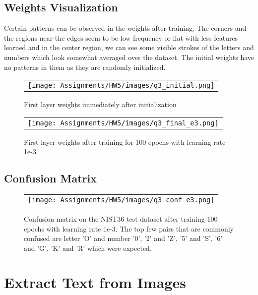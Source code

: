 \documentclass[a4paper]{article}
\begin{document}
\subsection{Weights Visualization}
Certain patterns can be observed in the weights after training. The corners and the regions near the edges seem to be low frequency or flat with less features learned and in the center region, we can see some visible strokes of the letters and numbers which look somewhat averaged over the dataset. The initial weights have no patterns in them as they are randomly initialized.\\
\begin{figure}[!ht]
\centering
\begin{tabular}{c}
{\texttt{[image: Assignments/HW5/images/q3\_initial.png]}}
\end{tabular}
\caption{First layer weights immediately after initialization}
\end{figure}

\begin{figure}[!ht]
\centering
\begin{tabular}{c}
{\texttt{[image: Assignments/HW5/images/q3\_final\_e3.png]}}
\end{tabular}
\caption{First layer weights after training for 100 epochs with learning rate 1e-3}
\end{figure}

\subsection{Confusion Matrix}
\begin{figure}[!ht]
\centering
\begin{tabular}{c}
{\texttt{[image: Assignments/HW5/images/q3\_conf\_e3.png]}}
\end{tabular}
\caption{Confusion matrix on the NIST36 test dataset after training 100 epochs with learning rate 1e-3. The top few pairs that are commonly confused are letter 'O' and number '0', '2' and 'Z', '5' and 'S', '6' and 'G', 'K' and 'R' which were expected.}
\end{figure}

\section{Extract Text from Images}
\end{document}
